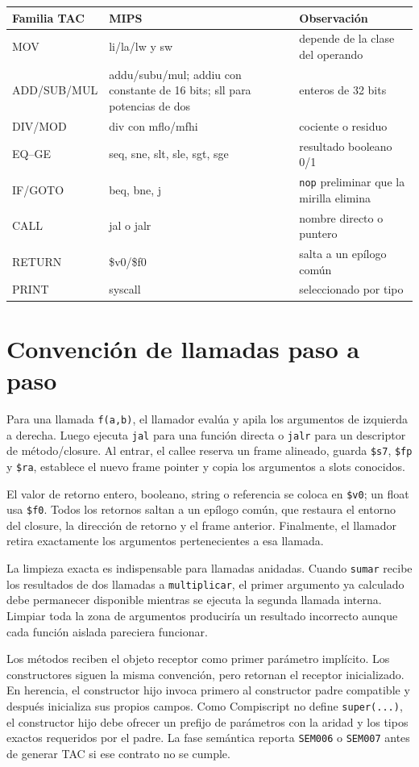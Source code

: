 \documentclass[11pt,letterpaper,oneside]{report}
\newcommand{\codigo}[1]{\texttt{#1}}
\begin{document}
\begin{longtable}{p{3cm}p{4.5cm}p{5.5cm}}
\toprule
Familia TAC & MIPS & Observaci\'on\\\midrule
\endhead
MOV & li/la/lw y sw & depende de la clase del operando\\
ADD/SUB/MUL & addu/subu/mul; addiu con constante de 16 bits; sll para potencias de dos & enteros de 32 bits\\
DIV/MOD & div con mflo/mfhi & cociente o residuo\\
EQ--GE & seq, sne, slt, sle, sgt, sge & resultado booleano 0/1\\
IF/GOTO & beq, bne, j & \codigo{nop} preliminar que la mirilla elimina\\
CALL & jal o jalr & nombre directo o puntero\\
RETURN & \$v0/\$f0 & salta a un ep\'ilogo com\'un\\
PRINT & syscall & seleccionado por tipo\\
\bottomrule
\end{longtable}

\section{Convenci\'on de llamadas paso a paso}

Para una llamada \codigo{f(a,b)}, el llamador eval\'ua y apila los argumentos de izquierda a derecha. Luego ejecuta \codigo{jal} para una funci\'on directa o \codigo{jalr} para un descriptor de m\'etodo/closure. Al entrar, el callee reserva un frame alineado, guarda \codigo{\$s7}, \codigo{\$fp} y \codigo{\$ra}, establece el nuevo frame pointer y copia los argumentos a slots conocidos.

El valor de retorno entero, booleano, string o referencia se coloca en \codigo{\$v0}; un float usa \codigo{\$f0}. Todos los retornos saltan a un ep\'ilogo com\'un, que restaura el entorno del closure, la direcci\'on de retorno y el frame anterior. Finalmente, el llamador retira exactamente los argumentos pertenecientes a esa llamada.

La limpieza exacta es indispensable para llamadas anidadas. Cuando \codigo{sumar} recibe los resultados de dos llamadas a \codigo{multiplicar}, el primer argumento ya calculado debe permanecer disponible mientras se ejecuta la segunda llamada interna. Limpiar toda la zona de argumentos producir\'ia un resultado incorrecto aunque cada funci\'on aislada pareciera funcionar.

Los m\'etodos reciben el objeto receptor como primer par\'ametro impl\'icito. Los constructores siguen la misma convenci\'on, pero retornan el receptor inicializado. En herencia, el constructor hijo invoca primero al constructor padre compatible y despu\'es inicializa sus propios campos. Como Compiscript no define \codigo{super(...)}, el constructor hijo debe ofrecer un prefijo de par\'ametros con la aridad y los tipos exactos requeridos por el padre. La fase sem\'antica reporta \codigo{SEM006} o \codigo{SEM007} antes de generar TAC si ese contrato no se cumple.
\end{document}
